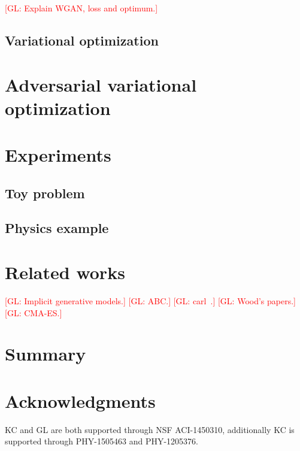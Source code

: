 \documentclass[twocolumn,superscriptaddress,aps]{revtex4-1}
\newcommand{\glnote}[1]{\textcolor{red}{[GL: #1]}}
\theoremstyle{plain}
\begin{document}
\glnote{Explain WGAN, loss and optimum.}

\subsection{Variational optimization}



\section{Adversarial variational optimization}



\section{Experiments}

\subsection{Toy problem}

\subsection{Physics example}



\section{Related works}


\glnote{Implicit generative models.}
\glnote{ABC.}
\glnote{carl~\citep{cranmer2015approximating}.}
\glnote{Wood's papers.}
\glnote{CMA-ES.}



\section{Summary}




\section*{Acknowledgments}

KC and GL are both supported through NSF ACI-1450310, additionally KC is
supported through PHY-1505463 and PHY-1205376.





\end{document}
